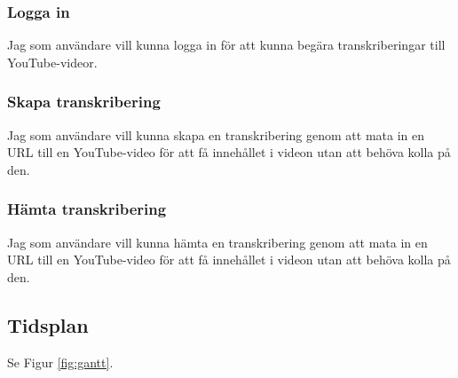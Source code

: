 \subsubsection{Logga in}
Jag som användare vill kunna logga in för att kunna begära transkriberingar
till YouTube-videor.

\subsubsection{Skapa transkribering}
Jag som användare vill kunna skapa en transkribering genom att mata in en URL
till en YouTube-video för att få innehållet i videon utan att behöva kolla på
den.

\subsubsection{Hämta transkribering}
Jag som användare vill kunna hämta en transkribering genom att mata in en URL
till en YouTube-video för att få innehållet i videon utan att behöva kolla på
den.

\subsection{Tidsplan}
Se Figur \ref{fig:gantt}.

